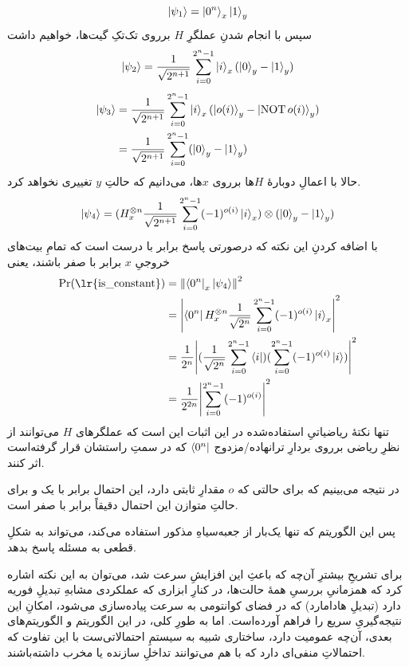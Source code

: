 \documentclass[a4paper,12pt]{article}
\DeclareMathOperator{\NOT}{NOT}
\begin{document}
\begin{equation}
    \ket{\psi_1} = \ket{0^n}_x \ket{1}_y
\end{equation}
سپس با انجام شدنِ عملگرِ \(H\) برروی تک‌تکِ گیت‌ها، خواهیم داشت
\begin{equation}
    \ket{\psi_2} = \frac{1}{\sqrt{2^{n+1}}}\sum_{i = 0}^{2^n - 1} \ket{i}_x (\ket{0}_y - \ket{1}_y)
\end{equation}
\begin{align}
    \ket{\psi_3} &= \frac{1}{\sqrt{2^{n+1}}}\sum_{i = 0}^{2^n - 1} \ket{i}_x (\ket{o(i)}_y - \ket{\NOT o(i)}_y) \\
     &= \frac{1}{\sqrt{2^{n+1}}}\sum_{i = 0}^{2^n - 1}(\ket{0}_y - \ket{1}_y)
\end{align}
حالا با اعمالِ دوبارهٔ \(H\)ها برروی \(x\)ها، می‌دانیم که حالتِ \(y\) تغییری نخواهد کرد.
\begin{equation}
    \ket{\psi_4} = (H^{\otimes n}_x \frac{1}{\sqrt{2^{n+1}}}\sum_{i = 0}^{2^n - 1}  (-1)^{o(i)}\ket{i}_x ) \otimes (\ket{0}_y - \ket{1}_y)
\end{equation}
با اضافه کردنِ این نکته که درصورتی پاسخ 
برابر با درست است که تمامِ بیت‌های خروجیِ \(x\) برابر با صفر باشند، یعنی
\begin{align}
    \Pr(\text{\lr{\lstinline{is_constant}}}) &= \norm{\bra{0^n}_x \ket{\psi_4}}^2 \\
     &= \abs{\bra{0^n}H^{\otimes n}_x \frac{1}{\sqrt{2^{n}}}\sum_{i = 0}^{2^n - 1}  (-1)^{o(i)}\ket{i}_x}^2 \\
     &= \frac{1}{2^n}\abs{(\frac{1}{\sqrt{2^{n}}}\sum_{i = 0}^{2^n - 1} \bra{i}) (\sum_{i = 0}^{2^n - 1}  (-1)^{o(i)}\ket{i})}^2 \\
     &= \frac{1}{2^{2n}}\abs{\sum_{i = 0}^{2^n - 1} (-1)^{o(i)}}^2
\end{align}
تنها نکتهٔ ریاضیاتیِ استفاده‌شده در این اثبات این است که عملگرهای \(H\) می‌توانند از نظرِ ریاضی برروی بردارِ ترانهاده/مزدوج 
\( \bra{0^n} \)
که در سمتِ راستشان قرار گرفته‌است اثر کنند.

در نتیجه می‌بینیم که برای حالتی که \(o\) مقدارِ ثابتی دارد، این احتمال برابر با یک و برای حالتِ متوازن این احتمال دقیقاً برابر با صفر است.

پس این الگوریتم که تنها یک‌بار از جعبه‌سیاهِ مذکور استفاده می‌کند، می‌تواند به شکلِ قطعی به مسئله پاسخ بدهد.

برای تشریحِ بیشترِ آن‌چه که باعثِ این افزایشِ سرعت شد، می‌توان به این نکته اشاره کرد که همزمانیِ بررسیِ همهٔ حالت‌ها، در کنارِ ابزاری که عملکردی مشابهِ تبدیلِ فوریه دارد (تبدیلِ هادامارد) که در فضای کوانتومی به سرعت پیاده‌سازی می‌شود، امکانِ این نتیجه‌گیریِ سریع را فراهم آورده‌است. اما به طورِ کلی، در این الگوریتم و الگوریتم‌های بعدی، آن‌چه عمومیت دارد، ساختاری شبیه به سیستمِ احتمالاتی‌ست با این تفاوت که احتمالاتِ منفی‌ای دارد که با هم می‌توانند تداخلِ سازنده یا مخرب داشته‌باشند.
\end{document}

